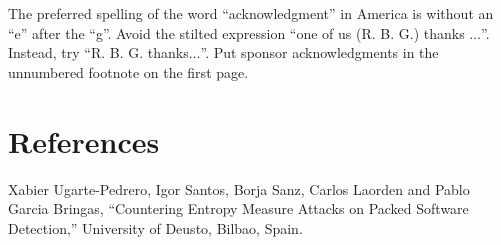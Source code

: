 \documentclass[conference]{IEEEtran}
\begin{document}
The preferred spelling of the word ``acknowledgment'' in America is without 
an ``e'' after the ``g''. Avoid the stilted expression ``one of us (R. B. 
G.) thanks $\ldots$''. Instead, try ``R. B. G. thanks$\ldots$''. Put sponsor 
acknowledgments in the unnumbered footnote on the first page.

\section*{References}



\begin{thebibliography}{00}
 Xabier Ugarte-Pedrero, Igor Santos, Borja Sanz, Carlos Laorden and Pablo Garcia Bringas, ``Countering Entropy Measure Attacks on Packed
Software Detection,'' University of Deusto, Bilbao, Spain.

\end{thebibliography}
\vspace{12pt}
\color{red}
\end{document}
